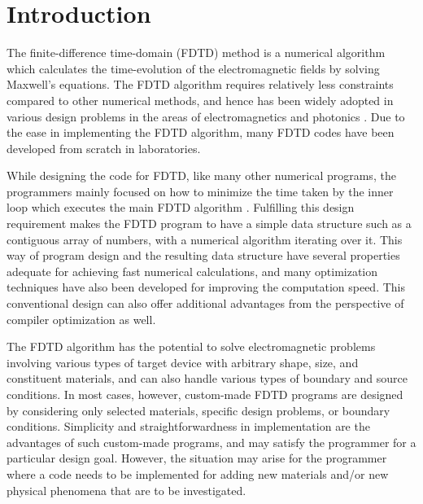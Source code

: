 \section{Introduction}
\label{sec:intro}
The finite-difference time-domain (FDTD) method is a numerical algorithm which calculates the time-evolution of the electromagnetic fields by solving Maxwell's equations. The FDTD algorithm requires relatively less constraints compared to other numerical methods, and hence has been widely adopted in various design problems in the areas of electromagnetics and photonics \cite{taflove_computational_2005}. Due to the ease in implementing the FDTD algorithm, many FDTD codes have been developed from scratch in laboratories.

While designing the code for FDTD, like many other numerical programs, the programmers mainly focused on how to minimize the time taken by the inner loop which executes the main FDTD algorithm \cite{oskooi_meep:_2010}. Fulfilling this design requirement makes the FDTD program to have a simple data structure such as a contiguous array of numbers, with a numerical algorithm iterating over it. This way of program design and the resulting data structure have several properties adequate for achieving fast numerical calculations, and many optimization techniques have also been developed for improving the computation speed. This conventional design can also offer additional advantages from the perspective of compiler optimization \cite{allen_optimizing_2001} as well. 

The FDTD algorithm has the potential to solve electromagnetic problems involving various types of target device with arbitrary shape, size, and constituent materials, and can also handle various types of boundary and source conditions. In most cases, however, custom-made FDTD programs are designed by considering only selected materials, specific design problems, or boundary conditions. Simplicity and straightforwardness in implementation are the advantages of such custom-made programs, and may satisfy the programmer for a particular design goal. However, the situation may arise for the programmer where a code needs to be implemented for adding new materials and/or new physical phenomena that are to be investigated. 

